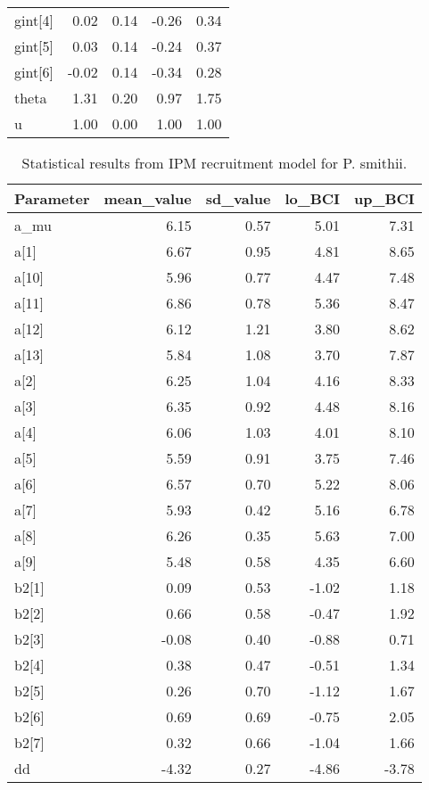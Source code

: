\documentclass[12pt,]{article}
\begin{document}
\begin{table}[ht]
{\begin{tabular}{lrrrr}
  gint[4] & 0.02 & 0.14 & -0.26 & 0.34 \\ 
  gint[5] & 0.03 & 0.14 & -0.24 & 0.37 \\ 
  gint[6] & -0.02 & 0.14 & -0.34 & 0.28 \\ 
  theta & 1.31 & 0.20 & 0.97 & 1.75 \\ 
  u & 1.00 & 0.00 & 1.00 & 1.00 \\ 
   \hline
\end{tabular}
}
\end{table}\begin{table}[ht]
\centering
\caption{Statistical results from IPM recruitment model for P. smithii.} 
{\footnotesize
\begin{tabular}{lrrrr}
  \hline
Parameter & mean\_value & sd\_value & lo\_BCI & up\_BCI \\ 
  \hline
a\_mu & 6.15 & 0.57 & 5.01 & 7.31 \\ 
  a[1] & 6.67 & 0.95 & 4.81 & 8.65 \\ 
  a[10] & 5.96 & 0.77 & 4.47 & 7.48 \\ 
  a[11] & 6.86 & 0.78 & 5.36 & 8.47 \\ 
  a[12] & 6.12 & 1.21 & 3.80 & 8.62 \\ 
  a[13] & 5.84 & 1.08 & 3.70 & 7.87 \\ 
  a[2] & 6.25 & 1.04 & 4.16 & 8.33 \\ 
  a[3] & 6.35 & 0.92 & 4.48 & 8.16 \\ 
  a[4] & 6.06 & 1.03 & 4.01 & 8.10 \\ 
  a[5] & 5.59 & 0.91 & 3.75 & 7.46 \\ 
  a[6] & 6.57 & 0.70 & 5.22 & 8.06 \\ 
  a[7] & 5.93 & 0.42 & 5.16 & 6.78 \\ 
  a[8] & 6.26 & 0.35 & 5.63 & 7.00 \\ 
  a[9] & 5.48 & 0.58 & 4.35 & 6.60 \\ 
  b2[1] & 0.09 & 0.53 & -1.02 & 1.18 \\ 
  b2[2] & 0.66 & 0.58 & -0.47 & 1.92 \\ 
  b2[3] & -0.08 & 0.40 & -0.88 & 0.71 \\ 
  b2[4] & 0.38 & 0.47 & -0.51 & 1.34 \\ 
  b2[5] & 0.26 & 0.70 & -1.12 & 1.67 \\ 
  b2[6] & 0.69 & 0.69 & -0.75 & 2.05 \\ 
  b2[7] & 0.32 & 0.66 & -1.04 & 1.66 \\ 
  dd & -4.32 & 0.27 & -4.86 & -3.78 \\ 

\end{tabular}}
\end{table}
\end{document}
